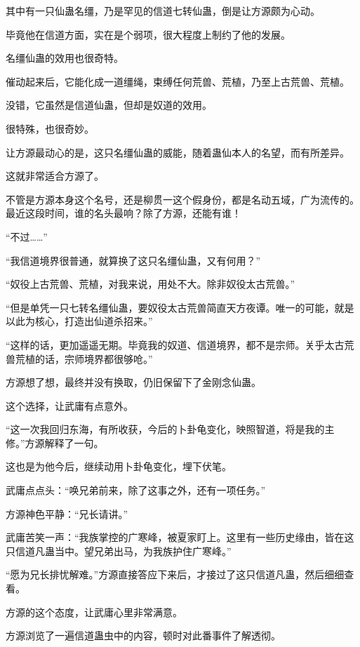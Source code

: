 
\begin{this_body}

其中有一只仙蛊名缰，乃是罕见的信道七转仙蛊，倒是让方源颇为心动。

毕竟他在信道方面，实在是个弱项，很大程度上制约了他的发展。

名缰仙蛊的效用也很奇特。

催动起来后，它能化成一道缰绳，束缚任何荒兽、荒植，乃至上古荒兽、荒植。

没错，它虽然是信道仙蛊，但却是奴道的效用。

很特殊，也很奇妙。

让方源最动心的是，这只名缰仙蛊的威能，随着蛊仙本人的名望，而有所差异。

这就非常适合方源了。

不管是方源本身这个名号，还是柳贯一这个假身份，都是名动五域，广为流传的。最近这段时间，谁的名头最响？除了方源，还能有谁！

“不过……”

“我信道境界很普通，就算换了这只名缰仙蛊，又有何用？”

“奴役上古荒兽、荒植，对我来说，用处不大。除非奴役太古荒兽。”

“但是单凭一只七转名缰仙蛊，要奴役太古荒兽简直天方夜谭。唯一的可能，就是以此为核心，打造出仙道杀招来。”

“这样的话，更加遥遥无期。毕竟我的奴道、信道境界，都不是宗师。关乎太古荒兽荒植的话，宗师境界都很够呛。”

方源想了想，最终并没有换取，仍旧保留下了金刚念仙蛊。

这个选择，让武庸有点意外。

“这一次我回归东海，有所收获，今后的卜卦龟变化，映照智道，将是我的主修。”方源解释了一句。

这也是为他今后，继续动用卜卦龟变化，埋下伏笔。

武庸点点头：“唤兄弟前来，除了这事之外，还有一项任务。”

方源神色平静：“兄长请讲。”

武庸苦笑一声：“我族掌控的广寒峰，被夏家盯上。这里有一些历史缘由，皆在这只信道凡蛊当中。望兄弟出马，为我族护住广寒峰。”

“愿为兄长排忧解难。”方源直接答应下来后，才接过了这只信道凡蛊，然后细细查看。

方源的这个态度，让武庸心里非常满意。

方源浏览了一遍信道蛊虫中的内容，顿时对此番事件了解透彻。


\end{this_body}

